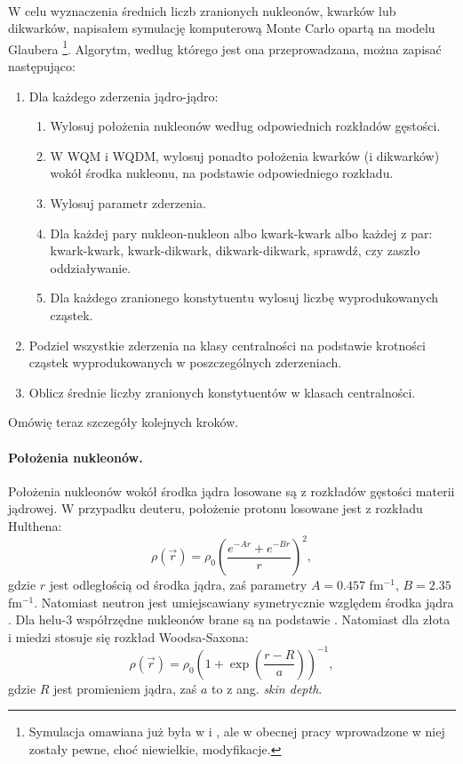 \documentclass[a4paper,12pt]{article}
\begin{document}
\paragraph{}
W celu wyznaczenia średnich liczb zranionych nukleonów, kwarków lub dikwarków, napisałem symulację komputerową Monte Carlo opartą na modelu Glaubera \cite{Loizides:2014vua} \footnote{Symulacja omawiana już była w \cite{Barej:pracaInz18} i \cite{Barej:2017kcw}, ale w obecnej pracy wprowadzone w niej zostały pewne, choć niewielkie, modyfikacje.}. Algorytm, według którego jest ona przeprowadzana, można zapisać następująco:
\begin{enumerate}
	\item Dla każdego zderzenia jądro-jądro:
	\begin{enumerate}
		\item Wylosuj położenia nukleonów według odpowiednich rozkładów gęstości.
		\item W WQM i WQDM, wylosuj ponadto położenia kwarków (i dikwarków) wokół środka nukleonu, na podstawie odpowiedniego rozkładu.
		\item Wylosuj parametr zderzenia.
		\item Dla każdej pary nukleon-nukleon albo kwark-kwark albo każdej z par: kwark-kwark, kwark-dikwark, dikwark-dikwark, sprawdź, czy zaszło oddziaływanie.
		\item Dla każdego zranionego konstytuentu wylosuj liczbę wyprodukowanych cząstek.
	\end{enumerate}
	\item Podziel wszystkie zderzenia na klasy centralności na podstawie krotności cząstek wyprodukowanych w poszczególnych zderzeniach.
	\item Oblicz średnie liczby zranionych konstytuentów w klasach centralności.
\end{enumerate}

Omówię teraz szczegóły kolejnych kroków.

\paragraph{Położenia nukleonów.}
Położenia nukleonów wokół środka jądra losowane są z rozkładów gęstości materii jądrowej. W przypadku deuteru, położenie protonu losowane jest z rozkładu Hulthena:
\begin{equation}
\rho(\vec{r})=\rho_0 \left(\frac{e^{-Ar}+e^{-Br}}{r}\right)^2,
\end{equation}
gdzie $r$ jest odległością od środka jądra, zaś parametry $A=0.457$ fm$^{-1}$, $B=2.35$ fm$^{-1}$. Natomiast neutron jest umiejscawiany symetrycznie względem środka jądra \cite{hulthen,Loizides:2014vua}. Dla helu-3 współrzędne nukleonów brane są na podstawie \cite{Carlson:1997qn}. Natomiast dla złota i miedzi stosuje się rozkład Woodsa-Saxona:
\begin{equation}
\rho(\vec{r})=\rho_0 \left( 1 + \exp \left( \frac{r - R}{a}\right)\right)^{-1},
\end{equation}
gdzie $R$ jest promieniem jądra, zaś $a$ to z ang. \textit{skin depth}.
\end{document}
